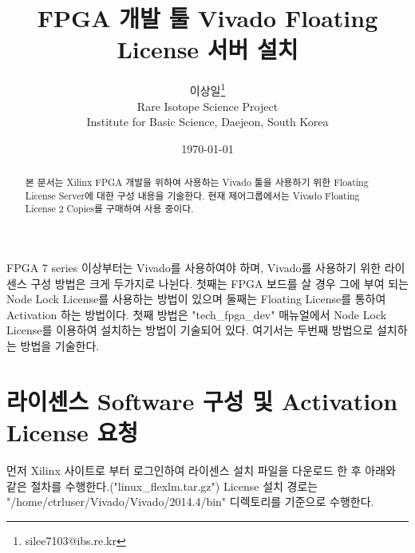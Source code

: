 \documentclass[11pt
  , a4paper
  , article
  , oneside
]{memoir}
\begin{document}
\newcommand{\technumber}{
  RAON Control-Document Series\\
  Revision : v1.0,   Release : 2016-03-14 fixed date}
\title{\textbf{FPGA 개발 툴 Vivado Floating License 서버 설치}}

\author{이상일\thanks{silee7103@ibs.re.kr} \\

  Rare Isotope Science Project\\
  Institute for Basic Science, Daejeon, South Korea
}
\date{\today}

\renewcommand{\maketitlehooka}{\begin{flushright}\textsf{\technumber}\end{flushright}}

\maketitle

\begin{abstract}
본 문서는 Xilinx FPGA 개발을 위하여 사용하는 Vivado 툴을 사용하기 위한 Floating License Server에 대한 구성 내용을 기술한다.
현재 제어그룹에서는 Vivado Floating License 2 Copies를 구매하여 사용 중이다.
\end{abstract}

FPGA 7 series 이상부터는 Vivado를 사용하여야 하며, Vivado를 사용하기 위한 라이센스 구성 방법은 크게 두가지로 나뉜다. 첫째는 FPGA 보드를 살 경우 그에 부여 되는 Node Lock License를 사용하는 방법이 있으며 둘째는 Floating License를 통하여 Activation 하는 방법이다. 첫째 방법은 "tech\_fpga\_dev" 매뉴얼에서 Node Lock License를 이용하여 설치하는 방법이 기술되어 있다. 여기서는 두번째 방법으로 설치하는 방법을 기술한다.




\chapter{라이센스 Software 구성 및 Activation License 요청}
먼저 Xilinx 사이트로 부터 로그인하여 라이센스 설치 파일을 다운로드 한 후 아래와 같은 절차를 수행한다.("linux\_flexlm.tar.gz")
License 설치 경로는 "/home/ctrluser/Vivado/Vivado/2014.4/bin" 디렉토리를 기준으로 수행한다.
\end{document}
